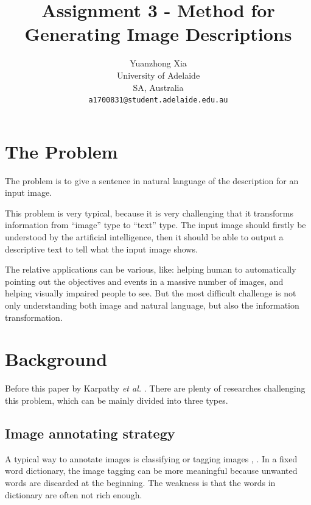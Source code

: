 \documentclass[10pt,twocolumn,letterpaper]{article}
\begin{document}
\title{Assignment 3 - Method for Generating Image Descriptions}
\author{Yuanzhong Xia\\
University of Adelaide\\
SA, Australia\\
{\tt\small a1700831@student.adelaide.edu.au}
}
\maketitle

\begin{abstract}
\end{abstract}

\section{The Problem}
The problem is to give a sentence in natural language of the description for an input image.

This problem is very typical, because it is very challenging that it transforms information from ``image'' type to ``text'' type.
The input image should firstly be understood by the artificial intelligence,
then it should be able to output a descriptive text to tell what the input image shows.

The relative applications can be various, like: helping human to automatically pointing out the objectives and events in a massive number of images,
and helping visually impaired people to see. But the most difficult challenge is not only understanding both image and natural language,
but also the information transformation.


\section{Background}
Before this paper by Karpathy \textit{et al.} \cite{origin}. There are plenty of researches challenging this problem,
which can be mainly divided into three types.

\subsection{Image annotating strategy}
A typical way to annotate images is classifying or tagging images \cite{everingham}, \cite{russakovsky}.
In a fixed word dictionary, the image tagging can be more meaningful because unwanted words are discarded at the beginning.
The weakness is that the words in dictionary are often not rich enough.
\end{document}
